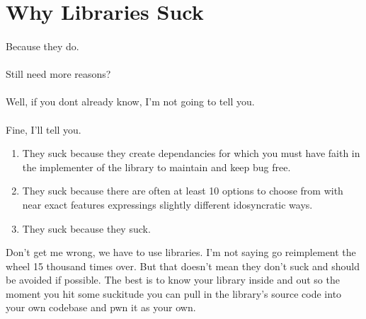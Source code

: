 \documentclass{book}
\begin{document}
\section{Why Libraries Suck}
\label{rant:librariessuck}
\paragraph{}
Because they do.
\paragraph{}
Still need more reasons?
\paragraph{}
Well, if you dont already know, I'm not going to tell you.
\paragraph{}
Fine, I'll tell you.
\begin{enumerate}
    \item They suck because they create dependancies for which you must have faith in the implementer of the library to maintain and keep bug free.
    \item They suck because there are often at least 10 options to choose from with near exact features expressings slightly different idosyncratic ways.
    \item They suck because they suck.
\end{enumerate}
Don't get me wrong, we have to use libraries. I'm not saying go reimplement the wheel 15 thousand times over. But that doesn't mean they don't suck and should be avoided if possible. The best is to know your library inside and out so the moment you hit some suckitude you can pull in the library's source code into your own codebase and \gls{pwn} it as your own.





\end{document}
